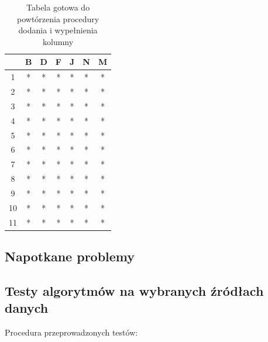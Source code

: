 \documentclass[12pt,twoside]{article}
\begin{document}
\begin{enumerate}[label=\arabic*), leftmargin=1.25cm]
          \begin{table}[ht]
              \caption{Tabela gotowa do powtórzenia procedury dodania i wypełnienia kolumny}
              \centering
              \begin{tabular}{|c|c|c|c|c|c|c|}
                  \hline
                     & B & D & F & J & N & M \\ \hline
                  1  & * & * & * & * & * & * \\ \hline
                  2  & * & * & * & * & * & * \\ \hline
                  3  & * & * & * & * & * & * \\ \hline
                  4  & * & * & * & * & * & * \\ \hline
                  5  & * & * & * & * & * & * \\ \hline
                  6  & * & * & * & * & * & * \\ \hline
                  7  & * & * & * & * & * & * \\ \hline
                  8  & * & * & * & * & * & * \\ \hline
                  9  & * & * & * & * & * & * \\ \hline
                  10 & * & * & * & * & * & * \\ \hline
                  11 & * & * & * & * & * & * \\ \hline
              \end{tabular}
              \label{tab:3_end}
          \end{table}
          \FloatBarrier
\end{enumerate}

\subsection{Napotkane problemy}
\subsection{Testy algorytmów na wybranych źródłach danych}

Procedura przeprowadzonych testów:
\end{document}
